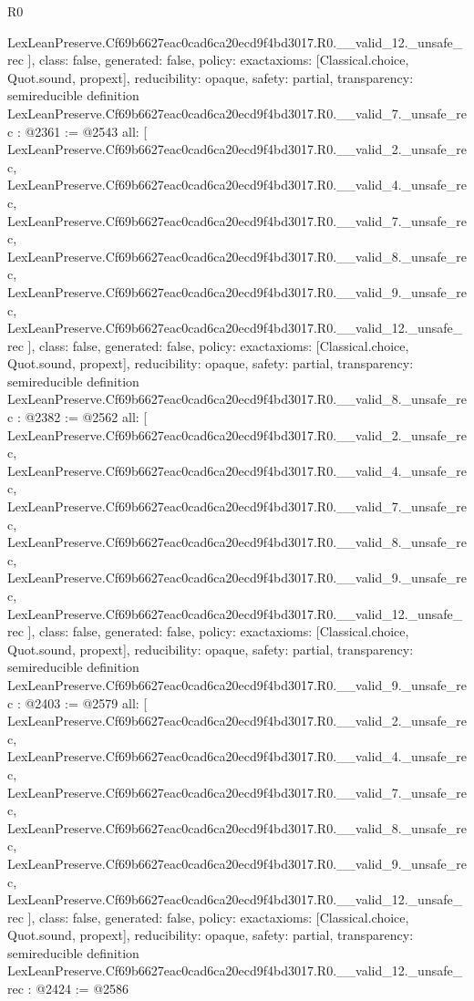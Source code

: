 \begin{lexlean}{R0}
\begin{coremodule}
{    LexLeanPreserve.Cf69b6627eac0cad6ca20ecd9f4bd3017.R0.__valid_12._unsafe_rec
  ],
  class: false,
  generated: false,
  policy: exact{axioms: [Classical.choice, Quot.sound, propext]},
  reducibility: opaque{},
  safety: partial,
  transparency: semireducible
}
definition LexLeanPreserve.Cf69b6627eac0cad6ca20ecd9f4bd3017.R0.__valid_7._unsafe_rec : @2361 := @2543 {
  all: [
    LexLeanPreserve.Cf69b6627eac0cad6ca20ecd9f4bd3017.R0.__valid_2._unsafe_rec,
    LexLeanPreserve.Cf69b6627eac0cad6ca20ecd9f4bd3017.R0.__valid_4._unsafe_rec,
    LexLeanPreserve.Cf69b6627eac0cad6ca20ecd9f4bd3017.R0.__valid_7._unsafe_rec,
    LexLeanPreserve.Cf69b6627eac0cad6ca20ecd9f4bd3017.R0.__valid_8._unsafe_rec,
    LexLeanPreserve.Cf69b6627eac0cad6ca20ecd9f4bd3017.R0.__valid_9._unsafe_rec,
    LexLeanPreserve.Cf69b6627eac0cad6ca20ecd9f4bd3017.R0.__valid_12._unsafe_rec
  ],
  class: false,
  generated: false,
  policy: exact{axioms: [Classical.choice, Quot.sound, propext]},
  reducibility: opaque{},
  safety: partial,
  transparency: semireducible
}
definition LexLeanPreserve.Cf69b6627eac0cad6ca20ecd9f4bd3017.R0.__valid_8._unsafe_rec : @2382 := @2562 {
  all: [
    LexLeanPreserve.Cf69b6627eac0cad6ca20ecd9f4bd3017.R0.__valid_2._unsafe_rec,
    LexLeanPreserve.Cf69b6627eac0cad6ca20ecd9f4bd3017.R0.__valid_4._unsafe_rec,
    LexLeanPreserve.Cf69b6627eac0cad6ca20ecd9f4bd3017.R0.__valid_7._unsafe_rec,
    LexLeanPreserve.Cf69b6627eac0cad6ca20ecd9f4bd3017.R0.__valid_8._unsafe_rec,
    LexLeanPreserve.Cf69b6627eac0cad6ca20ecd9f4bd3017.R0.__valid_9._unsafe_rec,
    LexLeanPreserve.Cf69b6627eac0cad6ca20ecd9f4bd3017.R0.__valid_12._unsafe_rec
  ],
  class: false,
  generated: false,
  policy: exact{axioms: [Classical.choice, Quot.sound, propext]},
  reducibility: opaque{},
  safety: partial,
  transparency: semireducible
}
definition LexLeanPreserve.Cf69b6627eac0cad6ca20ecd9f4bd3017.R0.__valid_9._unsafe_rec : @2403 := @2579 {
  all: [
    LexLeanPreserve.Cf69b6627eac0cad6ca20ecd9f4bd3017.R0.__valid_2._unsafe_rec,
    LexLeanPreserve.Cf69b6627eac0cad6ca20ecd9f4bd3017.R0.__valid_4._unsafe_rec,
    LexLeanPreserve.Cf69b6627eac0cad6ca20ecd9f4bd3017.R0.__valid_7._unsafe_rec,
    LexLeanPreserve.Cf69b6627eac0cad6ca20ecd9f4bd3017.R0.__valid_8._unsafe_rec,
    LexLeanPreserve.Cf69b6627eac0cad6ca20ecd9f4bd3017.R0.__valid_9._unsafe_rec,
    LexLeanPreserve.Cf69b6627eac0cad6ca20ecd9f4bd3017.R0.__valid_12._unsafe_rec
  ],
  class: false,
  generated: false,
  policy: exact{axioms: [Classical.choice, Quot.sound, propext]},
  reducibility: opaque{},
  safety: partial,
  transparency: semireducible
}
definition LexLeanPreserve.Cf69b6627eac0cad6ca20ecd9f4bd3017.R0.__valid_12._unsafe_rec : @2424 := @2586 {
}
\end{coremodule}
\end{lexlean}
